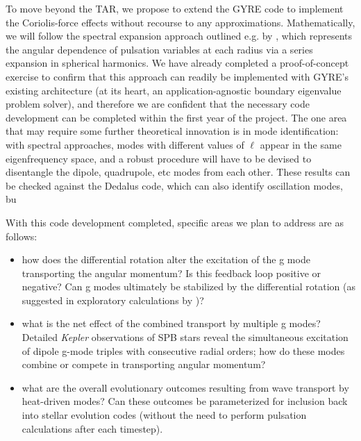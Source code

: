 To move beyond the TAR, we propose to extend the GYRE code to implement the Coriolis-force effects without recourse to any approximations. Mathematically, we will follow the spectral expansion approach outlined e.g. by \citet{Lee:2001}, which represents the angular dependence of pulsation variables at each radius via a series expansion in spherical harmonics. We have already completed a proof-of-concept exercise to confirm that this approach can readily be implemented with GYRE's existing architecture (at its heart, an application-agnostic boundary eigenvalue problem solver), and therefore we are confident that the necessary code development can be completed within the first year of the project. The one area that may require some further theoretical innovation is in mode identification: with spectral approaches, modes with different values of $\ell$ appear in the same eigenfrequency space, and a robust procedure will have to be devised to disentangle the dipole, quadrupole, etc modes from each other. These results can be checked against the Dedalus code, which can also identify oscillation modes, bu

With this code development completed, specific areas we plan to address are as follows:
\begin{itemize}
\item how does the differential rotation alter the excitation of the g mode transporting the angular momentum? Is this feedback loop positive or negative? Can g modes ultimately be stabilized by the differential rotation (as suggested in exploratory calculations by \cite{Townsend:2008})?
\item what is the net effect of the combined transport by multiple g modes? Detailed \emph{Kepler} observations of SPB stars \citep[e.g., KIC 10526294][]{Papics:2014} reveal the simultaneous excitation of dipole g-mode triples with consecutive radial orders; how do these modes combine or compete in transporting angular momentum?
\item what are the overall evolutionary outcomes resulting from wave transport by heat-driven modes? Can these outcomes be parameterized for inclusion back into stellar evolution codes (without the need to perform pulsation calculations after each timestep).
\end{itemize}
